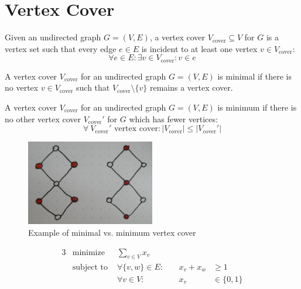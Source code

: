 \section{Vertex Cover}

\begin{definition}
  Given an undirected graph \(G=(V,E)\), a vertex cover
  \(V_{\text{cover}} \subseteq V\) for \(G\) is a vertex set such that
  every edge \(e \in E\) is incident to at least one vertex
  \(v \in V_{\text{cover}}\):
  \[ \forall e \in E: \exists v \in V_{\text{cover}}: v \in e \]
\end{definition}


\begin{definition}
  A vertex cover \(V_{\text{cover}}\) for an undirected graph
  \(G=(V,E)\) is minimal if there is no vertex
  \(v \in V_{\text{cover}}\) such that
  \(V_{\text{cover}} \setminus \{v\}\) remains a vertex cover.
\end{definition}


\begin{definition}
  A vertex cover \(V_{\text{cover}}\) for an undirected graph
  \(G=(V,E)\) is minimum if there is no other vertex cover
  \(V_{\text{cover}}'\) for \(G\) which has fewer vertices:
  \[
    \forall~V_{\text{cover}}'\text{ vertex cover} :
    |V_{\text{cover}}| \leq |V_{\text{cover}}'|
  \]
\end{definition}

\begin{figure}[ht]
  \centering
  \includegraphics[width=0.5\textwidth]{img/example_vertex_cover.jpg}
  \caption{Example of minimal vs. minimum vertex cover}
\end{figure}


\begin{problem}
  \begin{alignat*}{3}
    &\text{minimize } & \sum\limits_{v \in V} x_v \\
    &\text{subject to } & \forall \{v,w\} \in E : &~& x_v + x_w &\geq 1 \\
    && \forall v \in V : &~& x_v &\in \{0,1\}
  \end{alignat*}
\end{problem}

